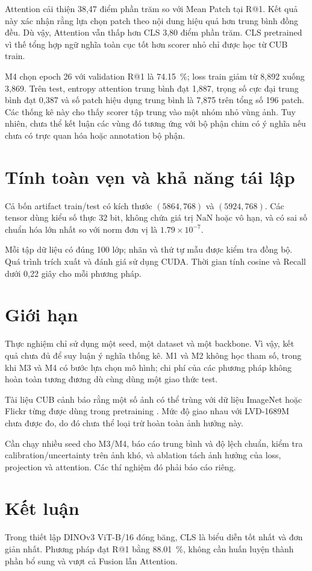 \documentclass[11pt,a4paper]{article}
\begin{document}
Attention cải thiện 38,47 điểm phần trăm so với Mean Patch tại R@1. Kết quả này xác nhận rằng lựa chọn patch theo nội dung hiệu quả hơn trung bình đồng đều. Dù vậy, Attention vẫn thấp hơn CLS 3,80 điểm phần trăm. CLS pretrained vì thế tổng hợp ngữ nghĩa toàn cục tốt hơn scorer nhỏ chỉ được học từ CUB train.

M4 chọn epoch 26 với validation R@1 là \SI{74.15}{\percent}; loss train giảm từ 8,892 xuống 3,869. Trên test, entropy attention trung bình đạt 1,887, trọng số cực đại trung bình đạt 0,387 và số patch hiệu dụng trung bình là 7,875 trên tổng số 196 patch. Các thống kê này cho thấy scorer tập trung vào một nhóm nhỏ vùng ảnh. Tuy nhiên, chưa thể kết luận các vùng đó tương ứng với bộ phận chim có ý nghĩa nếu chưa có trực quan hóa hoặc annotation bộ phận.

\section{Tính toàn vẹn và khả năng tái lập}
Cả bốn artifact train/test có kích thước $(5864,768)$ và $(5924,768)$. Các tensor dùng kiểu số thực 32 bit, không chứa giá trị NaN hoặc vô hạn, và có sai số chuẩn hóa lớn nhất so với norm đơn vị là $1.79\times10^{-7}$.

Mỗi tập dữ liệu có đúng 100 lớp; nhãn và thứ tự mẫu được kiểm tra đồng bộ. Quá trình trích xuất và đánh giá sử dụng CUDA. Thời gian tính cosine và Recall dưới 0,22 giây cho mỗi phương pháp.

\section{Giới hạn}
Thực nghiệm chỉ sử dụng một seed, một dataset và một backbone. Vì vậy, kết quả chưa đủ để suy luận ý nghĩa thống kê. M1 và M2 không học tham số, trong khi M3 và M4 có bước lựa chọn mô hình; chi phí của các phương pháp không hoàn toàn tương đương dù cùng dùng một giao thức test.

Tài liệu CUB cảnh báo rằng một số ảnh có thể trùng với dữ liệu ImageNet hoặc Flickr từng được dùng trong pretraining \cite{wah2011cub}. Mức độ giao nhau với LVD-1689M chưa được đo, do đó chưa thể loại trừ hoàn toàn ảnh hưởng này.

Cần chạy nhiều seed cho M3/M4, báo cáo trung bình và độ lệch chuẩn, kiểm tra calibration/uncertainty trên ảnh khó, và ablation tách ảnh hưởng của loss, projection và attention. Các thí nghiệm đó phải báo cáo riêng.

\section{Kết luận}
Trong thiết lập DINOv3 ViT-B/16 đóng băng, CLS là biểu diễn tốt nhất và đơn giản nhất. Phương pháp đạt R@1 bằng \SI{88.01}{\percent}, không cần huấn luyện thành phần bổ sung và vượt cả Fusion lẫn Attention.
\end{document}

